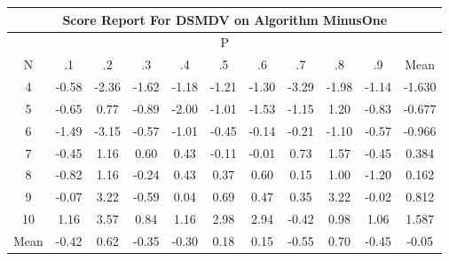 \documentclass[11pt,a4paper]{report}
\begin{document}
\begin{longtable}{ | c || c | c | c | c | c | c | c | c | c || c |}
\hline
\multicolumn{11}{|c|}{ Score Report For DSMDV on Algorithm MinusOne} \\
\hline
\multicolumn{11}{|c|}{ P } \\
\hline
N & .1 & .2 & .3 & .4 & .5 & .6 & .7 & .8 & .9 & Mean\\
 \hline
 \hline
 \endhead
  4 &  \cellcolor[HTML]{FFEFEF} -0.58 &  \cellcolor[HTML]{FFC7C7} -2.36 &  \cellcolor[HTML]{FFD7D7} -1.62 &  \cellcolor[HTML]{FFDFDF} -1.18 &  \cellcolor[HTML]{FFDFDF} -1.21 &  \cellcolor[HTML]{FFDFDF} -1.30 &  \cellcolor[HTML]{FFAFAF} -3.29 &  \cellcolor[HTML]{FFCFCF} -1.98 &  \cellcolor[HTML]{FFDFDF} -1.14 & -1.630 \\
  5 &  \cellcolor[HTML]{FFEFEF} -0.65 &  \cellcolor[HTML]{EFEFFF} 0.77 &  \cellcolor[HTML]{FFE7E7} -0.89 &  \cellcolor[HTML]{FFCFCF} -2.00 &  \cellcolor[HTML]{FFE7E7} -1.01 &  \cellcolor[HTML]{FFD7D7} -1.53 &  \cellcolor[HTML]{FFDFDF} -1.15 &  \cellcolor[HTML]{DFDFFF} 1.20 &  \cellcolor[HTML]{FFE7E7} -0.83 & -0.677 \\
  6 &  \cellcolor[HTML]{FFD7D7} -1.49 &  \cellcolor[HTML]{FFAFAF} -3.15 &  \cellcolor[HTML]{FFEFEF} -0.57 &  \cellcolor[HTML]{FFE7E7} -1.01 &  \cellcolor[HTML]{FFF7F7} -0.45 &  \cellcolor[HTML]{FFFFFF} -0.14 &  \cellcolor[HTML]{FFF7F7} -0.21 &  \cellcolor[HTML]{FFE7E7} -1.10 &  \cellcolor[HTML]{FFEFEF} -0.57 & -0.966 \\
  7 &  \cellcolor[HTML]{FFF7F7} -0.45 &  \cellcolor[HTML]{DFDFFF} 1.16 &  \cellcolor[HTML]{EFEFFF} 0.60 &  \cellcolor[HTML]{F7F7FF} 0.43 &  \cellcolor[HTML]{FFFFFF} -0.11 &  \cellcolor[HTML]{FFFFFF} -0.01 &  \cellcolor[HTML]{EFEFFF} 0.73 &  \cellcolor[HTML]{D7D7FF} 1.57 &  \cellcolor[HTML]{FFF7F7} -0.45 & 0.384 \\
  8 &  \cellcolor[HTML]{FFE7E7} -0.82 &  \cellcolor[HTML]{DFDFFF} 1.16 &  \cellcolor[HTML]{FFF7F7} -0.24 &  \cellcolor[HTML]{F7F7FF} 0.43 &  \cellcolor[HTML]{F7F7FF} 0.37 &  \cellcolor[HTML]{EFEFFF} 0.60 &  \cellcolor[HTML]{FFFFFF} 0.15 &  \cellcolor[HTML]{E7E7FF} 1.00 &  \cellcolor[HTML]{FFDFDF} -1.20 & 0.162 \\
  9 &  \cellcolor[HTML]{FFFFFF} -0.07 &  \cellcolor[HTML]{AFAFFF} 3.22 &  \cellcolor[HTML]{FFEFEF} -0.59 &  \cellcolor[HTML]{FFFFFF} 0.04 &  \cellcolor[HTML]{EFEFFF} 0.69 &  \cellcolor[HTML]{F7F7FF} 0.47 &  \cellcolor[HTML]{F7F7FF} 0.35 &  \cellcolor[HTML]{AFAFFF} 3.22 &  \cellcolor[HTML]{FFFFFF} -0.02 & 0.812 \\
  10 &  \cellcolor[HTML]{DFDFFF} 1.16 &  \cellcolor[HTML]{A7A7FF} 3.57 &  \cellcolor[HTML]{E7E7FF} 0.84 &  \cellcolor[HTML]{DFDFFF} 1.16 &  \cellcolor[HTML]{B7B7FF} 2.98 &  \cellcolor[HTML]{B7B7FF} 2.94 &  \cellcolor[HTML]{FFF7F7} -0.42 &  \cellcolor[HTML]{E7E7FF} 0.98 &  \cellcolor[HTML]{E7E7FF} 1.06 & 1.587 \\
 \hline
 \hline
Mean &  \cellcolor[HTML]{FFF7F7} -0.42 &  \cellcolor[HTML]{EFEFFF} 0.62 &  \cellcolor[HTML]{FFF7F7} -0.35 &  \cellcolor[HTML]{FFF7F7} -0.30 &  \cellcolor[HTML]{F7F7FF} 0.18 &  \cellcolor[HTML]{FFFFFF} 0.15 &  \cellcolor[HTML]{FFEFEF} -0.55 &  \cellcolor[HTML]{EFEFFF} 0.70 &  \cellcolor[HTML]{FFF7F7} -0.45 &  \cellcolor[HTML]{FFFFFF} -0.05
\end{longtable}
\end{document}
